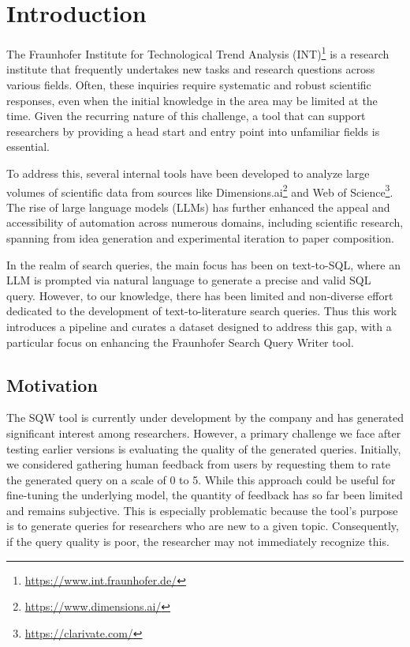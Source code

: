 
\chapter{Introduction}\label{ch:intro}
The Fraunhofer Institute for Technological Trend Analysis (INT)\footnote{\url{https://www.int.fraunhofer.de/}} is a research institute that frequently undertakes new tasks and research questions across various fields. Often, these inquiries require systematic and robust scientific responses, even when the initial knowledge in the area may be limited at the time. Given the recurring nature of this challenge, a tool that can support researchers by providing a head start and entry point into unfamiliar fields is essential.

To address this, several internal tools have been developed to analyze large volumes of scientific data from sources like Dimensions.ai\footnote{\url{https://www.dimensions.ai/}} and Web of Science\footnote{\url{https://clarivate.com/}}. The rise of large language models (LLMs) has further enhanced the appeal and accessibility of automation across numerous domains, including scientific research, spanning from idea generation and experimental iteration to paper composition\cite{lu2024aiscientistfullyautomated}.

In the realm of search queries, the main focus has been on text-to-SQL\cite{dong2023c3}, where an LLM is prompted via natural language to generate a precise and valid SQL query. However, to our knowledge, there has been limited and non-diverse effort dedicated to the development of text-to-literature search queries. Thus this work introduces a pipeline and curates a dataset designed to address this gap, with a particular focus on enhancing the Fraunhofer Search Query Writer tool.

\section{Motivation}
The SQW tool is currently under development by the company and has generated significant interest among researchers. However, a primary challenge we face after testing earlier versions is evaluating the quality of the generated queries. Initially, we considered gathering human feedback from users by requesting them to rate the generated query on a scale of 0 to 5. While this approach could be useful for fine-tuning the underlying model, the quantity of feedback has so far been limited and remains subjective. This is especially problematic because the tool’s purpose is to generate queries for researchers who are new to a given topic. Consequently, if the query quality is poor, the researcher may not immediately recognize this.

